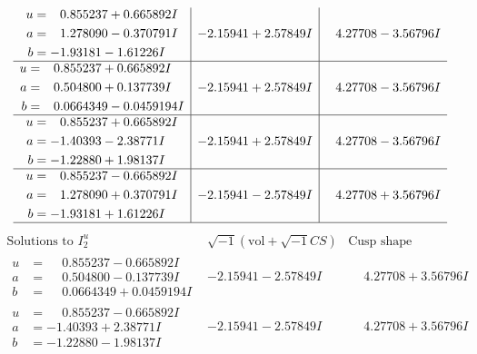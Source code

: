 \documentclass[1p]{elsarticle_modified}
\theoremstyle{definition}
\newcommand{\I}{\sqrt{-1}}
\begin{document}
$$\begin{array}{c|c|c}
\begin{aligned}
u &= \phantom{-}0.855237 + 0.665892 I \\
a &= \phantom{-}1.278090 - 0.370791 I \\
b &= -1.93181 - 1.61226 I\end{aligned}
 & -2.15941 + 2.57849 I & \phantom{-}4.27708 - 3.56796 I \\ \hline\begin{aligned}
u &= \phantom{-}0.855237 + 0.665892 I \\
a &= \phantom{-}0.504800 + 0.137739 I \\
b &= \phantom{-}0.0664349 - 0.0459194 I\end{aligned}
 & -2.15941 + 2.57849 I & \phantom{-}4.27708 - 3.56796 I \\ \hline\begin{aligned}
u &= \phantom{-}0.855237 + 0.665892 I \\
a &= -1.40393 - 2.38771 I \\
b &= -1.22880 + 1.98137 I\end{aligned}
 & -2.15941 + 2.57849 I & \phantom{-}4.27708 - 3.56796 I \\ \hline\begin{aligned}
u &= \phantom{-}0.855237 - 0.665892 I \\
a &= \phantom{-}1.278090 + 0.370791 I \\
b &= -1.93181 + 1.61226 I\end{aligned}
 & -2.15941 - 2.57849 I & \phantom{-}4.27708 + 3.56796 I\\
 \hline 
 \end{array}$$\newpage$$\begin{array}{c|c|c}  
\text{Solutions to }I^u_{2}& \I (\text{vol} + \sqrt{-1}CS) & \text{Cusp shape}\\
 \hline 
\begin{aligned}
u &= \phantom{-}0.855237 - 0.665892 I \\
a &= \phantom{-}0.504800 - 0.137739 I \\
b &= \phantom{-}0.0664349 + 0.0459194 I\end{aligned}
 & -2.15941 - 2.57849 I & \phantom{-}4.27708 + 3.56796 I \\ \hline\begin{aligned}
u &= \phantom{-}0.855237 - 0.665892 I \\
a &= -1.40393 + 2.38771 I \\
b &= -1.22880 - 1.98137 I\end{aligned}
 & -2.15941 - 2.57849 I & \phantom{-}4.27708 + 3.56796 I \\ \hline\begin{aligned}

\end{aligned}
\end{array}$$
\end{document}
